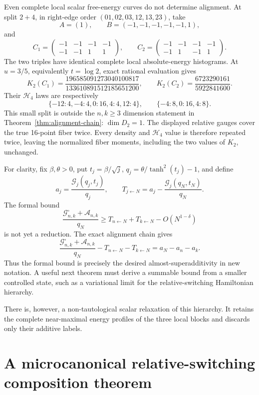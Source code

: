 \documentclass[11pt]{article}
\begin{document}
Even complete local scalar free-energy curves do not determine alignment.
At split $2+4$, in right-edge order $(01,02,03,12,13,23)$, take
\[
 A=(1),\qquad B=(-1,-1,-1,-1,-1,1),
\]
and
\[
 C_1=\begin{pmatrix}-1&-1&-1&-1\\-1&-1&1&1\end{pmatrix},\qquad
 C_2=\begin{pmatrix}-1&-1&-1&-1\\-1&1&-1&1\end{pmatrix}.
\]
The two triples have identical complete local absolute-energy histograms.
At $u=3/5$, equivalently $t=\log2$, exact rational evaluation gives
\[
 K_2(C_1)=
 \frac{196585091273040100817}{133610891512185651200},
 \qquad
 K_2(C_2)=\frac{6723290161}{5922841600}.
\]
Their $\mathcal H_4$ laws are respectively
\[
 \{-12:4,-4:4,0:16,4:4,12:4\},\qquad
 \{-4:8,0:16,4:8\}.
\]
This small split is outside the $n,k\ge3$ dimension statement in
Theorem~\ref{thm:alignment-chain}: $\dim D_2=1$.  The displayed relative
gauges cover the true 16-point fiber twice.  Every density and
$\mathcal H_4$ value is therefore repeated twice, leaving the normalized
fiber moments, including the two values of $K_2$, unchanged.

For clarity, fix $\beta,\theta>0$, put
$t_j=\beta/\sqrt j$, $q_j=\theta/\tanh^2(t_j)-1$, and define
\[
 a_j=\frac{\mathcal G_j(q_j,t_j)}{q_j},\qquad
 T_{j\leftarrow N}
 =a_j-\frac{\mathcal G_j(q_N,t_N)}{q_N}.
\]
The formal bound
\[
 \frac{\mathcal G_{n,k}^{\square}+\mathcal A_{n,k}}{q_N}
 \ge T_{n\leftarrow N}+T_{k\leftarrow N}-O(N^{1-\delta})
\]
is not yet a reduction.  The exact alignment chain gives
\[
 \frac{\mathcal G_{n,k}^{\square}+\mathcal A_{n,k}}{q_N}
 -T_{n\leftarrow N}-T_{k\leftarrow N}
 =a_N-a_n-a_k.
\]
Thus the formal bound is precisely the desired almost-superadditivity in new
notation.  A useful next theorem must derive a summable bound from a smaller
controlled state, such as a variational limit for the relative-switching
Hamiltonian hierarchy.

There is, however, a non-tautological scalar relaxation of this hierarchy.
It retains the complete near-maximal energy profiles of the three local
blocks and discards only their additive labels.

\section{A microcanonical relative-switching composition theorem}
\end{document}
